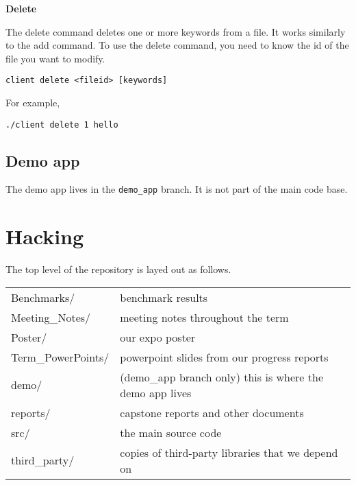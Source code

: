 \noindent\textbf{Delete}

The delete command deletes one or more keywords from a file.
It works similarly to the add command.
To use the delete command, you need to know the id of the file you want to modify.

\begin{lstlisting}
client delete <fileid> [keywords]
\end{lstlisting}

For example,

\begin{lstlisting}
./client delete 1 hello
\end{lstlisting}

\subsection{Demo app}

The demo app lives in the \texttt{demo\_app} branch.
It is not part of the main code base.


\section{Hacking}

The top level of the repository is layed out as follows.

\begin{tabular}{ll}
    Benchmarks/         & benchmark results \\
    Meeting\_Notes/      & meeting notes throughout the term \\
    Poster/             & our expo poster \\
    Term\_PowerPoints/   & powerpoint slides from our progress reports \\
    demo/               & (demo\_app branch only) this is where the demo app lives \\
    reports/            & capstone reports and other documents \\
    src/                & the main source code \\
    third\_party/        & copies of third-party libraries that we depend on \\
\end{tabular}



